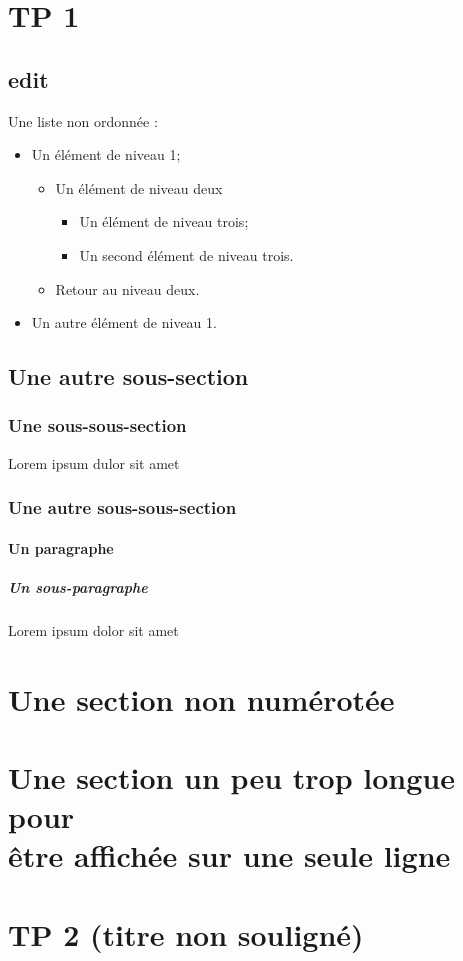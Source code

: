 \section{TP 1}

\subsection{edit}

Une liste non ordonnée :
\begin{itemize}
    \item Un élément de niveau 1;
    \begin{itemize}
        \item Un élément de niveau deux
        \begin{itemize}
            \item Un élément de niveau trois;
            \item Un second élément de niveau trois.
        \end{itemize}
        \item Retour au niveau deux.
    \end{itemize}
    \item Un autre élément de niveau 1.
\end{itemize}

\subsection{Une autre sous-section}
\subsubsection{Une sous-sous-section}
Lorem ipsum dulor sit amet
\subsubsection{Une autre sous-sous-section}
\paragraph{Un paragraphe}
\subparagraph{Un sous-paragraphe}
Lorem ipsum dolor sit amet

\section*{Une section non numérotée}

\section[Une section qui est malheureusement un peu trop longue pour être affichée sur une seule ligne]{Une section un peu trop longue pour \\ être affichée sur une seule ligne}



\section{TP 2 (titre non souligné)}
